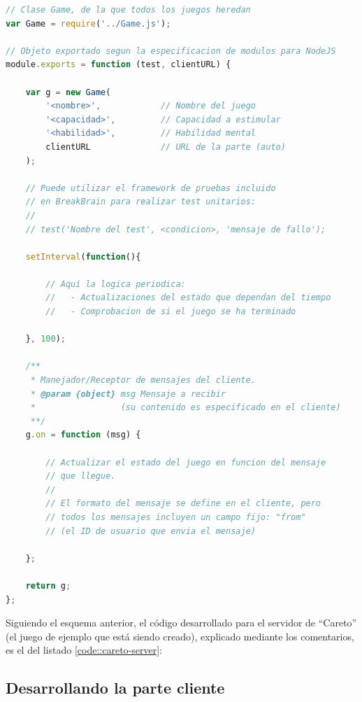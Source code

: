 \newpage
\begin{lstlisting}[frame=single, language=JavaScript, caption={Esquema de la parte servidora de un juego para BreakBrain}, label=code::game-server-scheme]
// Clase Game, de la que todos los juegos heredan
var Game = require('../Game.js');

// Objeto exportado segun la especificacion de modulos para NodeJS
module.exports = function (test, clientURL) {

    var g = new Game(
        '<nombre>',            // Nombre del juego
        '<capacidad>',         // Capacidad a estimular
        '<habilidad>',         // Habilidad mental
        clientURL              // URL de la parte (auto)
    );

    // Puede utilizar el framework de pruebas incluido
    // en BreakBrain para realizar test unitarios:
    // 
    // test('Nombre del test', <condicion>, 'mensaje de fallo');

    setInterval(function(){

        // Aqui la logica periodica:
        //   - Actualizaciones del estado que dependan del tiempo
        //   - Comprobacion de si el juego se ha terminado

    }, 100);

    /**
     * Manejador/Receptor de mensajes del cliente.
     * @param {object} msg Mensaje a recibir
     *                 (su contenido es especificado en el cliente)
     **/
    g.on = function (msg) {

        // Actualizar el estado del juego en funcion del mensaje
        // que llegue.
        //
        // El formato del mensaje se define en el cliente, pero
        // todos los mensajes incluyen un campo fijo: "from"
        // (el ID de usuario que envia el mensaje)

    };

    return g;
};
\end{lstlisting}

Siguiendo el esquema anterior, el código desarrollado para el servidor de ``Careto'' (el juego de ejemplo que está siendo creado), explicado mediante los comentarios, es el del listado \ref{code::careto-server}:

\vspace{0.5cm}


\subsection{Desarrollando la parte cliente}

